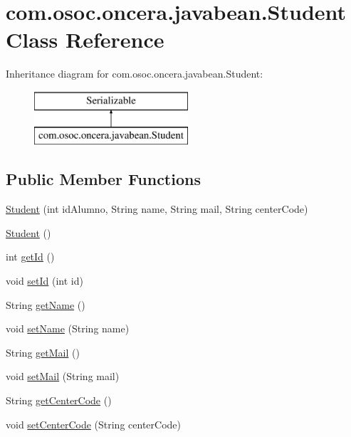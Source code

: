 \hypertarget{classcom_1_1osoc_1_1oncera_1_1javabean_1_1_student}{}\section{com.\+osoc.\+oncera.\+javabean.\+Student Class Reference}
\label{classcom_1_1osoc_1_1oncera_1_1javabean_1_1_student}
Inheritance diagram for com.\+osoc.\+oncera.\+javabean.\+Student\+:\begin{figure}[H]
\begin{center}
\leavevmode
\includegraphics[height=2.000000cm]{classcom_1_1osoc_1_1oncera_1_1javabean_1_1_student}
\end{center}
\end{figure}
\subsection*{Public Member Functions}
\begin{DoxyCompactItemize}
\item 
\mbox{\hyperlink{classcom_1_1osoc_1_1oncera_1_1javabean_1_1_student_a4f6b8eea66724bb07d9f0a08d5a7c05e}{Student}} (int id\+Alumno, String name, String mail, String center\+Code)
\item 
\mbox{\hyperlink{classcom_1_1osoc_1_1oncera_1_1javabean_1_1_student_a4ecf97e6c128767fa1a496de9fc55f3f}{Student}} ()
\item 
int \mbox{\hyperlink{classcom_1_1osoc_1_1oncera_1_1javabean_1_1_student_ac0c3941ff19d09960fee3c676432df88}{get\+Id}} ()
\item 
void \mbox{\hyperlink{classcom_1_1osoc_1_1oncera_1_1javabean_1_1_student_a5a9ffde625d6e9559c29b826fde56bc3}{set\+Id}} (int id)
\item 
String \mbox{\hyperlink{classcom_1_1osoc_1_1oncera_1_1javabean_1_1_student_a72903ef954a6688886d6ef3a83c93809}{get\+Name}} ()
\item 
void \mbox{\hyperlink{classcom_1_1osoc_1_1oncera_1_1javabean_1_1_student_a5d845e9851c05afb091bce95c5061f2e}{set\+Name}} (String name)
\item 
String \mbox{\hyperlink{classcom_1_1osoc_1_1oncera_1_1javabean_1_1_student_a89ef12ef7e0b65d07249a1f7459d6e27}{get\+Mail}} ()
\item 
void \mbox{\hyperlink{classcom_1_1osoc_1_1oncera_1_1javabean_1_1_student_ab0e5ec2ca34dbc0e9fb133413964569d}{set\+Mail}} (String mail)
\item 
String \mbox{\hyperlink{classcom_1_1osoc_1_1oncera_1_1javabean_1_1_student_a53793842a8aca87774c1f93c98bebe15}{get\+Center\+Code}} ()
\item 
void \mbox{\hyperlink{classcom_1_1osoc_1_1oncera_1_1javabean_1_1_student_ab514780b34fc2409462924f33e8cb419}{set\+Center\+Code}} (String center\+Code)
\end{DoxyCompactItemize}


